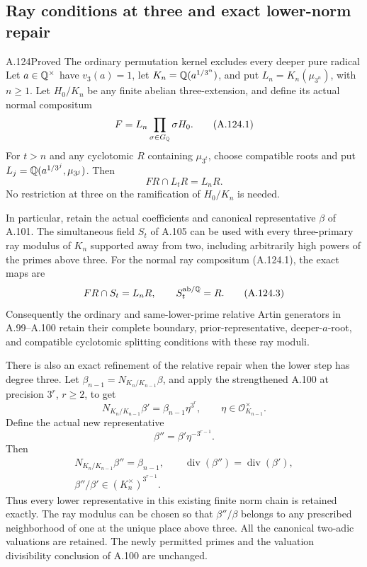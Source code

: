\subsection{Ray conditions at three and exact lower-norm repair}

\begin{statement}{A.124}{Proved}
{The ordinary permutation kernel excludes every deeper pure radical}
Let \(a\in\mathbb Q^\times\) have \(v_3(a)=1\), let
\(K_n=\mathbb Q(a^{1/3^n})\), and put
\(L_n=K_n(\mu_{3^n})\), with \(n\ge1\).
Let \(H_0/K_n\) be any finite abelian three-extension,
and define its actual normal compositum
\[
 F=L_n\prod_{\sigma\in G_\mathbb Q}\sigma H_0.
 \tag{A.124.1}
\]
For \(t>n\) and any cyclotomic \(R\) containing
\(\mu_{3^t}\), choose compatible roots and put
\(L_j=\mathbb Q(a^{1/3^j},\mu_{3^j})\).
Then
\[
                         FR\cap L_tR=L_nR.
 \tag{A.124.2}
\]
No restriction at three on the ramification of
\(H_0/K_n\) is needed.

In particular, retain the actual coefficients and
canonical representative \(\beta\) of A.101.
The simultaneous field \(S_t\) of A.105 can be used
with every three-primary ray modulus of \(K_n\)
supported away from two, including arbitrarily high
powers of the primes above three.
For the normal ray compositum (A.124.1), the exact maps are
\[
                  FR\cap S_t=L_nR,\qquad
                            S_t^{\rm ab/\mathbb Q}=R.
 \tag{A.124.3}
\]
Consequently the ordinary and same-lower-prime
relative Artin generators in A.99--A.100 retain
their complete boundary, prior-representative,
deeper-\(a\)-root, and compatible cyclotomic
splitting conditions with these ray moduli.

There is also an exact refinement of the relative
repair when the lower step has degree three.
Let \(\beta_{n-1}=N_{K_n/K_{n-1}}\beta\), and
apply the strengthened A.100 at precision \(3^r\),
\(r\ge2\), to get
\[
 N_{K_n/K_{n-1}}\beta'
              =\beta_{n-1}\eta^{3^r},
                  \qquad\eta\in\mathcal O_{K_{n-1}}^\times.
 \tag{A.124.4}
\]
Define the actual new representative
\[
                      \beta''=\beta'\eta^{-3^{r-1}}.
 \tag{A.124.5}
\]
Then
\[
 \begin{gathered}
 N_{K_n/K_{n-1}}\beta''=\beta_{n-1},\qquad
              \operatorname{div}(\beta'')=\operatorname{div}(\beta'),\\
 \beta''/\beta'\in(K_n^\times)^{3^{r-1}} .
 \end{gathered}
 \tag{A.124.6}
\]
Thus every lower representative in this existing
finite norm chain is retained exactly.
The ray modulus can be chosen so that \(\beta''/\beta\)
belongs to any prescribed neighborhood of one at
the unique place above three.
All the canonical two-adic valuations are retained.
The newly permitted primes and the valuation
divisibility conclusion of A.100 are unchanged.
\end{statement}

